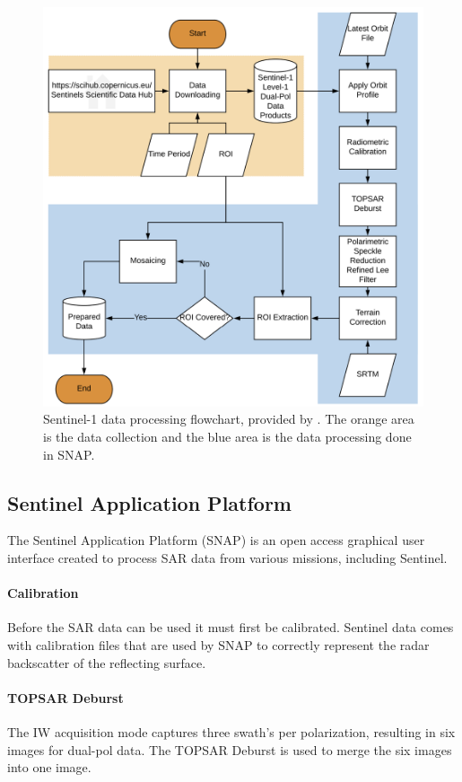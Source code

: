 \documentclass[conference]{IEEEtran}
\begin{document}
	\begin{figure}[htbp]
		\centerline{\includegraphics[scale=0.27]{Images/Hu_2018_Data_Preparation.PNG}}
		\caption{Sentinel-1 data processing flowchart, provided by \cite{Hu_2018}. The orange area is the data collection and the blue area is the data processing done in SNAP.}
		\label{img:Hu_2018_Data_Preparation}
	\end{figure}
	
	\subsection{Sentinel Application Platform}
	The Sentinel Application Platform (SNAP) is an open access graphical user interface created to process SAR data from various missions, including Sentinel.

	\paragraph{Calibration}
	Before the SAR data can be used it must first be calibrated. 
	Sentinel data comes with calibration files that are used by SNAP to correctly represent the radar backscatter of the reflecting surface.

	\paragraph{TOPSAR Deburst}
	The IW acquisition mode captures three swath's per polarization, resulting in six images for dual-pol data.
	The TOPSAR Deburst is used to merge the six images into one image.
	
\end{document}
